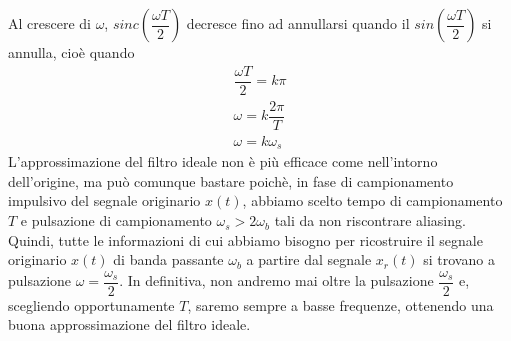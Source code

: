 \documentclass[a4paper]{report}
\begin{document}
Al crescere di $\omega$, $sinc \left( \dfrac{\omega T}{2}\right)$
decresce fino ad annullarsi quando il $sin \left( \dfrac{\omega
  T}{2}\right)$ si annulla, cio\`e quando
\begin{equation}
  \begin{array}{l}
    \dfrac{\omega T}{2} = k \pi\\
    \omega = k \dfrac{2 \pi}{T}\\
    \omega = k \omega_s
  \end{array}
\end{equation}
L'approssimazione del filtro ideale non \`e pi\`u efficace come
nell'intorno dell'origine, ma pu\`o comunque bastare poich\`e, in fase
di campionamento impulsivo del segnale originario $x(t)$, abbiamo
scelto tempo di campionamento $T$ e pulsazione di campionamento
$\omega_s > 2 \omega_b$ tali da non riscontrare aliasing. Quindi,
tutte le informazioni di cui abbiamo bisogno per ricostruire il
segnale originario $x(t)$ di banda passante $\omega_b$ a partire dal
segnale $x_r(t)$ si trovano a pulsazione $\omega =
\dfrac{\omega_s}{2}$. In definitiva, non andremo mai oltre la
pulsazione $\dfrac{\omega_s}{2}$ e, scegliendo opportunamente $T$,
saremo sempre a basse frequenze, ottenendo una buona approssimazione
del filtro ideale.
\end{document}
